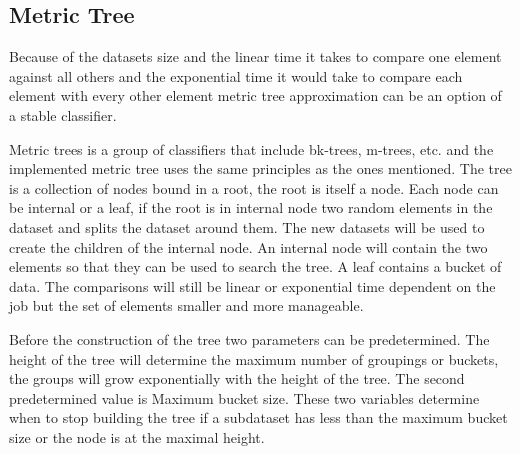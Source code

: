 \subsection{Metric Tree}
Because of the datasets size and the linear time it takes to compare one element against all others and the exponential time it would take to compare each element with every other element metric tree approximation can be an option of a stable classifier. 

Metric trees is a group of classifiers that include bk-trees, m-trees, etc. and the implemented metric tree uses the same principles as the ones mentioned. The tree is a collection of nodes bound in a root, the root is itself a node. Each node can be internal or a leaf, if the root is in internal node two random elements in the dataset and splits the dataset around them. The new datasets will be used to create the children of the internal node. An internal node will contain the two elements so that they can be used to search the tree. A leaf contains a bucket of data. The comparisons will still be linear or exponential time dependent on the job but the set of elements smaller and more manageable.

Before the construction of the tree two parameters can be predetermined. The height of the tree will determine the maximum number of groupings or buckets, the groups will grow exponentially with the height of the tree. The second predetermined value is Maximum bucket size. These two variables determine when to stop building the tree if a subdataset has less than the maximum bucket size or the node is at the maximal height.
